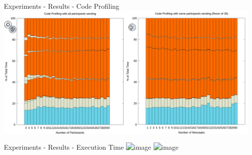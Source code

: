 \begin{frame}{Experiments - Results - Code Profiling}
    \centering
    \includegraphics[scale=0.157]{images/profile_both.png}
\end{frame}

\begin{frame}{Experiments - Results - Execution Time}
    \centering
    \includegraphics<1-1>[scale=0.23]{images/fixed_room.png}
    \includegraphics<2>[scale=0.23]{images/variable_room.png}
\end{frame}